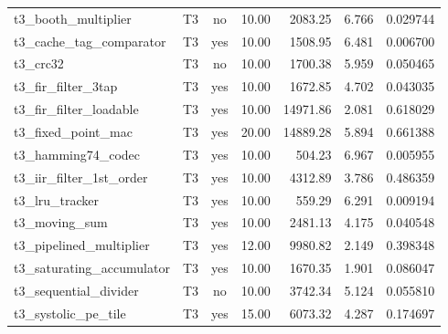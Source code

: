 \begin{tabular}{llcrrrr}
t3\_booth\_multiplier & T3 & no & 10.00 & 2083.25 & 6.766 & 0.029744 \\
t3\_cache\_tag\_comparator & T3 & yes & 10.00 & 1508.95 & 6.481 & 0.006700 \\
t3\_crc32 & T3 & no & 10.00 & 1700.38 & 5.959 & 0.050465 \\
t3\_fir\_filter\_3tap & T3 & yes & 10.00 & 1672.85 & 4.702 & 0.043035 \\
t3\_fir\_filter\_loadable & T3 & yes & 10.00 & 14971.86 & 2.081 & 0.618029 \\
t3\_fixed\_point\_mac & T3 & yes & 20.00 & 14889.28 & 5.894 & 0.661388 \\
t3\_hamming74\_codec & T3 & yes & 10.00 & 504.23 & 6.967 & 0.005955 \\
t3\_iir\_filter\_1st\_order & T3 & yes & 10.00 & 4312.89 & 3.786 & 0.486359 \\
t3\_lru\_tracker & T3 & yes & 10.00 & 559.29 & 6.291 & 0.009194 \\
t3\_moving\_sum & T3 & yes & 10.00 & 2481.13 & 4.175 & 0.040548 \\
t3\_pipelined\_multiplier & T3 & yes & 12.00 & 9980.82 & 2.149 & 0.398348 \\
t3\_saturating\_accumulator & T3 & yes & 10.00 & 1670.35 & 1.901 & 0.086047 \\
t3\_sequential\_divider & T3 & no & 10.00 & 3742.34 & 5.124 & 0.055810 \\
t3\_systolic\_pe\_tile & T3 & yes & 15.00 & 6073.32 & 4.287 & 0.174697 \\
\bottomrule
\end{tabular}
